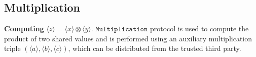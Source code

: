 \documentclass[letterpaper]{article} %
\begin{document}

    \subsection{Multiplication}
    \textbf{Computing} $ \langle z\rangle  = \langle x\rangle  \otimes \langle y\rangle $.
    $\mathtt{Multiplication}$ protocol is used to compute the product of two shared values
    and is performed using an auxiliary multiplication triple
    $(\langle a\rangle,\langle b\rangle,\langle c\rangle)$,
    which can be distributed from the trusted third party.
    \begin{figure}[ht]
\end{figure}
\end{document}
